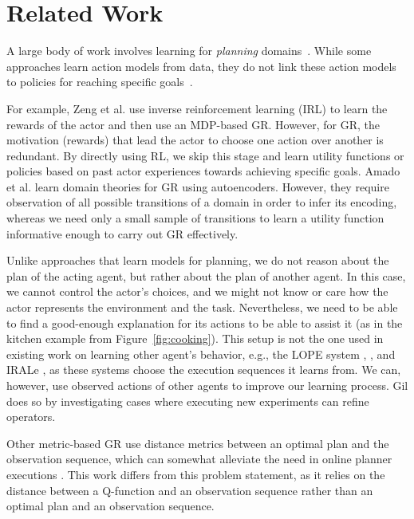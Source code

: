\documentclass[letterpaper]{article} %
\begin{document}
\section*{Related Work}
\label{sec:related_work}

A large body of work involves learning for \textit{planning} domains~\cite{zimmerman2003learning,arora2018review}. 
While some approaches learn action models from data, they do not link these action models to policies for reaching specific goals~\cite{amir2008learning,amado2019latrec,asai2020learning,juba2021safe}.

For example, Zeng et al.  use inverse reinforcement learning (IRL) to learn the rewards of the actor and then use an MDP-based GR. 
However, for GR, the motivation (rewards) that lead the actor to choose one action over another is redundant. 
By directly using RL, we skip this stage and learn utility functions or policies based on past actor experiences towards achieving specific goals. 
Amado et al.  learn domain theories for GR using autoencoders. 
However, they require observation of all possible transitions of a domain in order to infer its encoding, whereas we need only a small sample of transitions to learn a utility function informative enough to carry out GR effectively. 

Unlike approaches that learn models for planning, we do not reason about the plan of the acting agent, but rather about the plan of another agent. 
In this case, we cannot control the actor's choices, and we might not know or care how the actor represents the environment and the task. 
Nevertheless, we need to be able to find a good-enough explanation for its actions to be able to assist it (as in the kitchen example from Figure~\ref{fig:cooking}). 
This setup is not the one used in existing work on learning other agent's behavior, e.g., the LOPE system \cite{garcia2000integrated}, \cite{safaei2007incremental}, and IRALe \cite{rodrigues2011active}, as these systems choose the execution sequences it learns from. 
We can, however, use observed actions of other agents to improve our learning process. 
Gil  does so by investigating cases where executing new experiments can refine operators. 

Other metric-based GR use distance metrics between an optimal plan and the observation sequence, which can somewhat alleviate the need in online planner executions \cite{masters2017cost,mirsky2019new}. This work differs from this problem statement, as it relies on the distance between a Q-function and an observation sequence rather than an optimal plan and an observation sequence.
%
\end{document}
